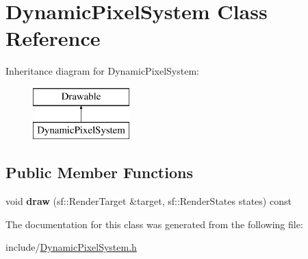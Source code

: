 \hypertarget{class_dynamic_pixel_system}{}\section{Dynamic\+Pixel\+System Class Reference}
\label{class_dynamic_pixel_system}
Inheritance diagram for Dynamic\+Pixel\+System\+:\begin{figure}[H]
\begin{center}
\leavevmode
\includegraphics[height=2.000000cm]{class_dynamic_pixel_system}
\end{center}
\end{figure}
\subsection*{Public Member Functions}
\begin{DoxyCompactItemize}
\item 
\mbox{\label{class_dynamic_pixel_system_a2797dc7b84f091dc26d8810a85d3c2ed}} 
void {\bfseries draw} (sf\+::\+Render\+Target \&target, sf\+::\+Render\+States states) const
\end{DoxyCompactItemize}


The documentation for this class was generated from the following file\+:\begin{DoxyCompactItemize}
\item 
include/\hyperlink{_dynamic_pixel_system_8h}{Dynamic\+Pixel\+System.\+h}\end{DoxyCompactItemize}
